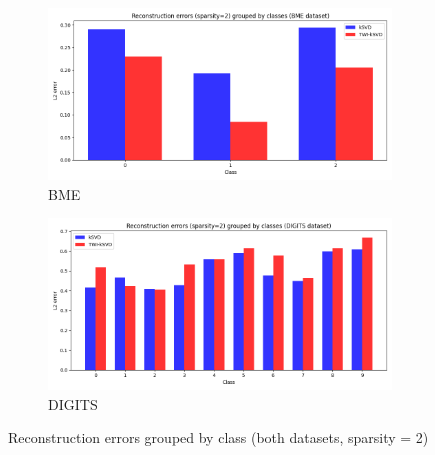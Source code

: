 \documentclass[11pt]{article}
\begin{document}
\begin{figure}[!ht]
    \centering
    \begin{subfigure}[b]{\textwidth}
      \includegraphics[width=\textwidth]{../../figures/class_barplot_BME_2.png}
      \caption*{BME}
    \end{subfigure}

    \begin{subfigure}[b]{\textwidth}
        \includegraphics[width=\textwidth]{../../figures/class_barplot_DIGITS_2.png}
        \caption*{DIGITS}
      \end{subfigure}
    \caption{Reconstruction errors grouped by class (both datasets, sparsity = 2)}\label{fig:barplots}
\end{figure}
\end{document}
